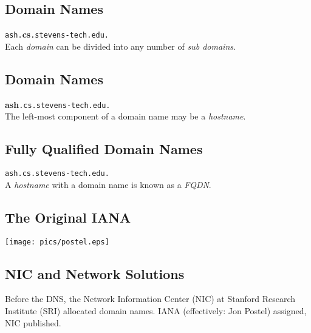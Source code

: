 \documentclass[xga]{xdvislides}
\begin{document}
\subsection{Domain Names}
\vspace{.5in}
\begin{center}
	\Huge
	\verb+ash.+{\bf cs}\verb+.stevens-tech.edu.+ \\
	\vspace{.5in}
	Each {\em domain} can be divided into any number of {\em sub domains}.
\end{center}
\Normalsize

\subsection{Domain Names}
\vspace{.5in}
\begin{center}
	\Huge
	{\bf ash}\verb+.cs.stevens-tech.edu.+ \\
	\vspace{.5in}
	The left-most component of a domain name may be a {\em hostname}.
\end{center}
\Normalsize

\subsection{Fully Qualified Domain Names}
\vspace{.5in}
\begin{center}
	\Huge
	\verb+ash.cs.stevens-tech.edu.+ \\
	\vspace{.5in}
	A {\em hostname} with a domain name is known as a {\em FQDN}.
\end{center}
\Normalsize

\subsection{The Original IANA}
\vspace*{\fill}
\begin{center}
	\texttt{[image: pics/postel.eps]}
\end{center}
\vspace*{\fill}

\subsection{NIC and Network Solutions}
Before the DNS, the Network Information Center (NIC)
at Stanford Research Institute (SRI) allocated domain
names. IANA (effectively: Jon Postel) assigned, NIC
published.  \\
\end{document}
